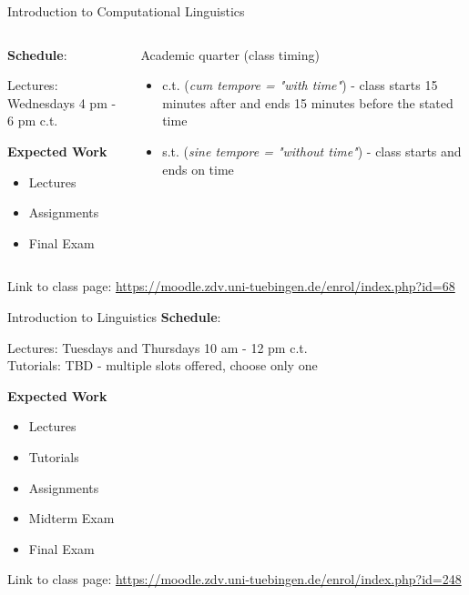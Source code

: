 \documentclass[aspectratio=169,hyperref={unicode},xcolor={dvipsnames}]{beamer}
\begin{document}
\begin{frame}{Introduction to Computational Linguistics}
\begin{columns}
	\begin{column}{0.5\linewidth}
		\textbf{Schedule}:
		
		Lectures: Wednesdays 4 pm - 6 pm c.t.
		\newline
		
		\textbf{Expected Work}
		\begin{itemize}
			\item Lectures
			\item Assignments
			\item Final Exam
		\end{itemize}

   	\end{column}
	\begin{column}{0.5\linewidth}
	\begin{alertblock}{Academic quarter (class timing)}
	\begin{itemize}
	 \item c.t. (\textit{cum tempore = "with time"}) - class starts 15 minutes after and ends 15 minutes before the stated time
	 \item s.t. (\textit{sine tempore = "without time"}) - class starts and ends on time
	 \end{itemize}
	 \end{alertblock}
	\end{column}
\end{columns}
\begin{center}
	Link to class page: \url{https://moodle.zdv.uni-tuebingen.de/enrol/index.php?id=68}
\end{center}
\end{frame}

\begin{frame}{Introduction to Linguistics}
		\textbf{Schedule}:
		
		Lectures: Tuesdays and Thursdays 10 am - 12 pm c.t.\\
		Tutorials: TBD - multiple slots offered, choose only one
		\newline
		
		\textbf{Expected Work}
		\begin{itemize}
			\item Lectures
			\item Tutorials
			\item Assignments
			\item Midterm Exam
			\item Final Exam
		\end{itemize}
	\begin{center}
	Link to class page: \url{https://moodle.zdv.uni-tuebingen.de/enrol/index.php?id=248}
\end{center}
\end{frame}
\end{document}
